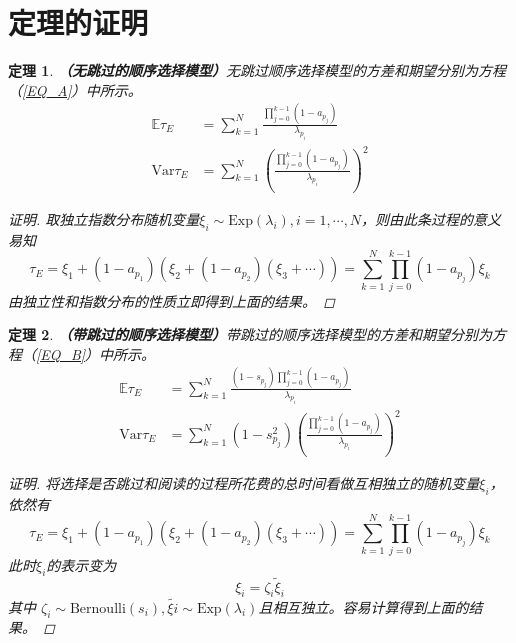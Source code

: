 \documentclass[UTF8]{ctexart}
\theoremstyle{plain}
\newtheorem{thm}{定理}[section]
\theoremstyle{definition}
\theoremstyle{remark}
\begin{document}
	\section{定理的证明}
	\begin{thm}\textbf{（无跳过的顺序选择模型）}无跳过顺序选择模型的方差和期望分别为方程（\ref{EQ_A}）中所示。
		\begin{equation*}
		\begin{aligned}
		\mathbb{E} \tau_E & = \sum_{k=1}^N \frac{\prod\limits_{j=0}^{k-1}(1-a_{p_j})}{\lambda_{p_i}} \\
		\mathrm{Var} \tau_E & = \sum_{k=1}^N \left(\frac{\prod\limits_{j=0}^{k-1}(1-a_{p_j})}{\lambda_{p_i}}\right)^2
		\end{aligned}
		\end{equation*}
	\begin{proof}[证明]
		取独立指数分布随机变量$\xi_i \sim \mathrm{Exp}(\lambda_i), i = 1, \cdots, N$，则由此条过程的意义易知
		$$
		\tau_E = \xi_1 + (1-a_{p_1})(\xi_2 + (1-a_{p_2})(\xi_3+\cdots)) = \sum_{k=1}^N \prod_{j=0}^{k-1} (1-a_{p_j}) \xi_k
		$$
		由独立性和指数分布的性质立即得到上面的结果。
	\end{proof}
	\end{thm}
	\begin{thm}\textbf{（带跳过的顺序选择模型）}带跳过的顺序选择模型的方差和期望分别为方程（\ref{EQ_B}）中所示。
		\begin{equation*}
		\begin{aligned}
		\mathbb{E} \tau_E & = \sum_{k=1}^N \frac{(1-s_{p_j})\prod\limits_{j=0}^{k-1}(1-a_{p_j})}{\lambda_{p_i}} \\
		\mathrm{Var} \tau_E & = \sum_{k=1}^N (1-s_{p_j}^2)\left(\frac{\prod\limits_{j=0}^{k-1}(1-a_{p_j})}{\lambda_{p_i}}\right)^2
		\end{aligned}
		\end{equation*}
		\begin{proof}[证明]
			将选择是否跳过和阅读的过程所花费的总时间看做互相独立的随机变量$\xi_i$，依然有
			$$
			\tau_E = \xi_1 + (1-a_{p_1})(\xi_2 + (1-a_{p_2})(\xi_3+\cdots)) = \sum_{k=1}^N \prod_{j=0}^{k-1} (1-a_{p_j}) \xi_k
			$$
			此时$\xi_i$的表示变为
			$$
			\xi_i = \zeta_i \tilde{\xi}_i
			$$
			其中
			$\zeta_i \sim \mathrm{Bernoulli}(s_i), \tilde{\xi{i}} \sim \mathrm{Exp}(\lambda_i)$且相互独立。容易计算得到上面的结果。
		\end{proof}
	\end{thm}
\end{document}
